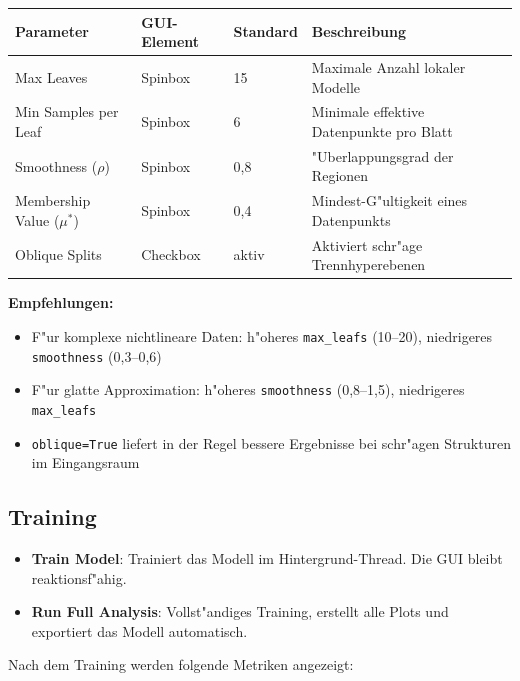 \documentclass[12pt,a4paper]{article}
\begin{document}
\begin{center}
\begin{tabular}{p{3.5cm}p{2cm}p{1.5cm}p{5cm}}
  \toprule
  \textbf{Parameter} & \textbf{GUI-Element} & \textbf{Standard} & \textbf{Beschreibung} \\
  \midrule
  Max Leaves & Spinbox & 15 & Maximale Anzahl lokaler Modelle \\
  Min Samples per Leaf & Spinbox & 6 & Minimale effektive Datenpunkte pro Blatt \\
  Smoothness ($\rho$) & Spinbox & 0{,}8 & "Uberlappungsgrad der Regionen \\
  Membership Value ($\mu^*$) & Spinbox & 0{,}4 & Mindest-G"ultigkeit eines Datenpunkts \\
  Oblique Splits & Checkbox & aktiv & Aktiviert schr"age Trennhyperebenen \\
  \bottomrule
\end{tabular}
\end{center}

\textbf{Empfehlungen:}
\begin{itemize}
  \item F"ur komplexe nichtlineare Daten: h"oheres \texttt{max\_leafs} (10--20), niedrigeres \texttt{smoothness} (0{,}3--0{,}6)
  \item F"ur glatte Approximation: h"oheres \texttt{smoothness} (0{,}8--1{,}5), niedrigeres \texttt{max\_leafs}
  \item \texttt{oblique=True} liefert in der Regel bessere Ergebnisse bei schr"agen Strukturen im Eingangsraum
\end{itemize}

\subsection{Training}

\begin{itemize}
  \item \textbf{Train Model}: Trainiert das Modell im Hintergrund-Thread. Die GUI bleibt reaktionsf"ahig.
  \item \textbf{Run Full Analysis}: Vollst"andiges Training, erstellt alle Plots und exportiert das Modell automatisch.
\end{itemize}

Nach dem Training werden folgende Metriken angezeigt:
\end{document}
